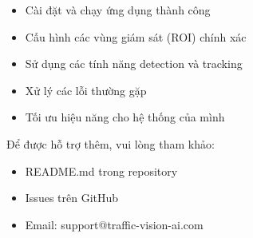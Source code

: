 \begin{itemize}
    \item Cài đặt và chạy ứng dụng thành công
    \item Cấu hình các vùng giám sát (ROI) chính xác
    \item Sử dụng các tính năng detection và tracking
    \item Xử lý các lỗi thường gặp
    \item Tối ưu hiệu năng cho hệ thống của mình
\end{itemize}

Để được hỗ trợ thêm, vui lòng tham khảo:
\begin{itemize}
    \item README.md trong repository
    \item Issues trên GitHub
    \item Email: support@traffic-vision-ai.com
\end{itemize}
